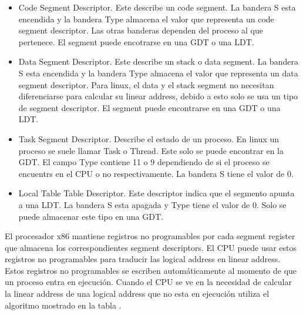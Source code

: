\begin{itemize}
\item Code Segment Descriptor. Este describe un code segment. La bandera S esta
encendida y la bandera Type almacena el valor que representa un code segment
descriptor. Las otras banderas dependen del proceso al que pertenece. El
segment puede encotrarse en una GDT o una LDT.
\item Data Segment Descriptor. Este describe un stack o data segment. La
bandera S esta encendida y la bandera Type almacena el valor que representa un
data segment descriptor. Para linux, el data y el stack segment no necesitan
diferenciarse para calcular su linear address, debido a esto solo se usa un
tipo de segment descriptor. El segment puede encontrarse en una GDT o una LDT.
\item Task Segment Descriptor. Describe el estado de un proceso. En linux un
proceso se suele llamar Task o Thread. Este solo se puede encontrar en la
GDT. El campo Type contiene 11 o 9 dependiendo de si el proceso se encuentrs en
el CPU o no respectivamente. La bandera S tiene el valor de 0.
\item Local Table Table Descriptor. Este descriptor indica que el segmento
apunta a una LDT. La bandera S esta apagada y Type tiene el valor de 0. Solo se
puede almacenar este tipo en una GDT.
\end{itemize}

El procesador x86 mantiene registros no programables por cada segment register
que almacena los correspondientes segment descriptors. El CPU puede usar estos
registros no programables para traducir las logical address en linear
address. Estos registros no programables se escriben automáticamente al momento
de que un proceso entra en ejecución. Cuando el CPU se ve en la necesidad de
calcular la linear address de una logical address que no esta en ejecución
utiliza el algoritmo mostrado en la tabla {}.

